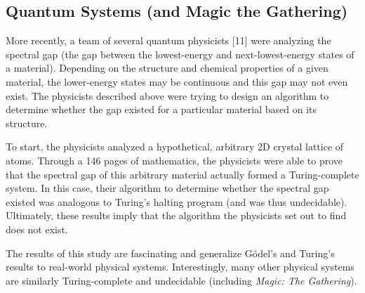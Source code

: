 \documentclass[conference]{IEEEtran}
\begin{document}
\subsection{Quantum Systems (and Magic the Gathering)} 
More recently, a team of several quantum physicists [11] were analyzing the spectral gap (the gap between the lowest-energy and next-lowest-energy states of a material). Depending on the structure and chemical properties of a given material, the lower-energy states may be continuous and this gap may not even exist. The physicists described above were trying to design an algorithm to determine whether the gap existed for a particular material based on its structure.

To start, the physicists analyzed a hypothetical, arbitrary 2D crystal lattice of atoms. Through a 146 pages of mathematics, the physicists were able to prove that the spectral gap of this arbitrary material actually formed a Turing-complete system. In this case, their algorithm to determine whether the spectral gap existed was analogous to Turing's halting program (and was thus undecidable). Ultimately, these results imply that the algorithm the physicists set out to find does not exist. 

The results of this study are fascinating and generalize Gödel's and Turing's results to real-world physical systems. Interestingly, many other physical systems are similarly Turing-complete and undecidable (including \emph{Magic: The Gathering}).
\end{document}
